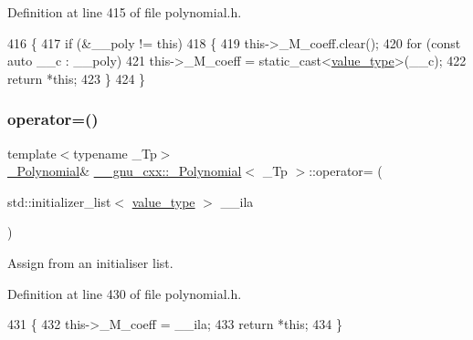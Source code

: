 Definition at line 415 of file polynomial.\+h.


\begin{DoxyCode}
416         \{
417           \textcolor{keywordflow}{if} (&\_\_poly != \textcolor{keyword}{this})
418             \{
419               this->\_M\_coeff.clear();
420               \textcolor{keywordflow}{for} (\textcolor{keyword}{const} \textcolor{keyword}{auto} \_\_c : \_\_poly)
421                 this->\_M\_coeff = \textcolor{keyword}{static\_cast<}\hyperlink{class____gnu__cxx_1_1__Polynomial_a725563351f50e76084a7a016c06f8a53}{value\_type}\textcolor{keyword}{>}(\_\_c);
422               \textcolor{keywordflow}{return} *\textcolor{keyword}{this};
423             \}
424         \}
\end{DoxyCode}
\mbox{\label{class____gnu__cxx_1_1__Polynomial_a44394532a2b1e67f1613b35402da9d47}} 
\subsubsection{\texorpdfstring{operator=()}{operator=()}\hspace{0.1cm}{\footnotesize\ttfamily [4/4]}}
{\footnotesize\ttfamily template$<$typename \+\_\+\+Tp$>$ \\
\hyperlink{class____gnu__cxx_1_1__Polynomial}{\+\_\+\+Polynomial}\& \hyperlink{class____gnu__cxx_1_1__Polynomial}{\+\_\+\+\_\+gnu\+\_\+cxx\+::\+\_\+\+Polynomial}$<$ \+\_\+\+Tp $>$\+::operator= (\begin{DoxyParamCaption}\item[{std\+::initializer\+\_\+list$<$ \hyperlink{class____gnu__cxx_1_1__Polynomial_a725563351f50e76084a7a016c06f8a53}{value\+\_\+type} $>$}]{\+\_\+\+\_\+ila }\end{DoxyParamCaption})\hspace{0.3cm}{\ttfamily [inline]}}

Assign from an initialiser list. 

Definition at line 430 of file polynomial.\+h.


\begin{DoxyCode}
431       \{
432         this->\_M\_coeff = \_\_ila;
433         \textcolor{keywordflow}{return} *\textcolor{keyword}{this};
434       \}
\end{DoxyCode}
\mbox{\label{class____gnu__cxx_1_1__Polynomial_adda717f35cc87205daf0ea7a16d5d1a7}} 
